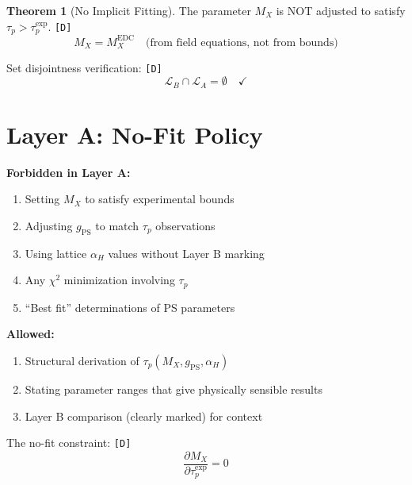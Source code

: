 \documentclass[11pt,a4paper]{article}
\newcommand{\tagD}{\textcolor{green!50!black}{\texttt{[D]}}}
\theoremstyle{definition}
\newtheorem{theorem}{Theorem}[section]
\begin{document}
\begin{theorem}[No Implicit Fitting]
\label{thm:no-fit}
The parameter $M_X$ is NOT adjusted to satisfy $\tau_p > \tau_p^{\text{exp}}$. \tagD{}
\begin{equation}
\label{eq:no-fit-mx}
M_X = M_X^{\text{EDC}} \quad \text{(from field equations, not from bounds)}
\end{equation}
\end{theorem}

Set disjointness verification: \tagD{}
\begin{equation}
\label{eq:set-disjoint}
\mathcal{L}_B \cap \mathcal{L}_A = \emptyset \quad \checkmark
\end{equation}

\section{Layer A: No-Fit Policy}
\label{sec:no-fit}

\begin{nofitbox}
\textbf{Forbidden in Layer A:}
\begin{enumerate}
  \item Setting $M_X$ to satisfy experimental bounds
  \item Adjusting $g_{\text{PS}}$ to match $\tau_p$ observations
  \item Using lattice $\alpha_H$ values without Layer B marking
  \item Any $\chi^2$ minimization involving $\tau_p$
  \item ``Best fit'' determinations of PS parameters
\end{enumerate}

\textbf{Allowed:}
\begin{enumerate}
  \item Structural derivation of $\tau_p(M_X, g_{\text{PS}}, \alpha_H)$
  \item Stating parameter ranges that give physically sensible results
  \item Layer B comparison (clearly marked) for context
\end{enumerate}
\end{nofitbox}

The no-fit constraint: \tagD{}
\begin{equation}
\label{eq:no-fit-constraint}
\frac{\partial M_X}{\partial \tau_p^{\text{exp}}} = 0
\end{equation}
\end{document}
